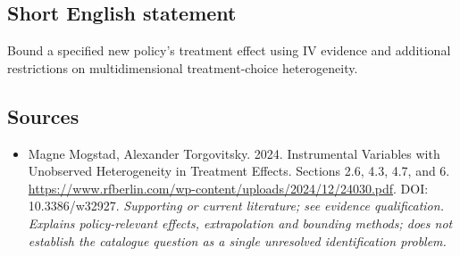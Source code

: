\documentclass[11pt]{article}
\begin{document}
\subsection{Short English statement}
Bound a specified new policy's treatment effect using IV evidence and additional restrictions on multidimensional treatment-choice heterogeneity.

\subsection{Sources}
\begin{itemize}\raggedright
\item[\textnormal{[S1]}]\hypertarget{source:30007706:1}{} Magne Mogstad, Alexander Torgovitsky. 2024. Instrumental Variables with Unobserved Heterogeneity in Treatment Effects. Sections 2.6, 4.3, 4.7, and 6.
\url{https://www.rfberlin.com/wp-content/uploads/2024/12/24030.pdf}.
DOI: 10.3386/w32927.
{\small\textit{Supporting or current literature; see evidence qualification. Explains policy-relevant effects, extrapolation and bounding methods; does not establish the catalogue question as a single unresolved identification problem.}}
\end{itemize}
\end{document}
